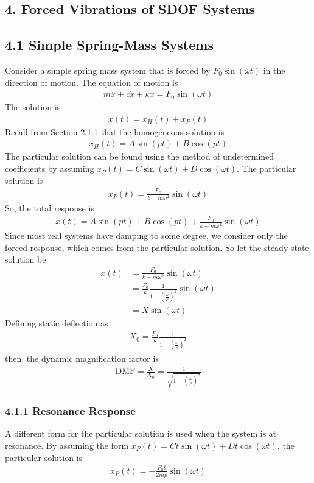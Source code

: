 \begin{multicols*}{2}
\section*{4. Forced Vibrations of SDOF Systems}
\subsection*{4.1 Simple Spring-Mass Systems}
Consider a simple spring mass system that is forced by $F_0 \sin(\omega t)$ in the direction of motion. The equation of motion is
\begin{align*}
    m\ddot{x} + c\dot{x} + kx = F_0\sin(\omega t)
\end{align*}
The solution is 
\begin{align*}
    x(t) = x_{H}(t) + x_{P}(t)
\end{align*}
Recall from Section 2.1.1 that the homogeneous solution is
\begin{align*}
    x_H(t) = A\sin(pt) + B\cos(pt)
\end{align*}
The particular solution can be found using the method of undetermined coefficients by assuming $x_P(t) = C\sin(\omega t) + D\cos(\omega t)$. The particular solution is
\begin{align*}
    x_P(t) = \frac{F_0}{k - m\omega^2}\sin(\omega t)
\end{align*}
So, the total response is
\begin{align*}
    x(t) = A\sin(pt) + B\cos(pt) + \frac{F_0}{k - m\omega^2}\sin(\omega t)
\end{align*}
Since most real systems have damping to some degree, we consider only the forced response, which comes from the particular solution. So let the steady state solution be
\begin{align*}
    x(t) &= \frac{F_0}{k - m\omega^2}\sin(\omega t) \\
    &= \frac{F_0}{k} \frac{1}{1 - \left(\frac{\omega}{p}\right)^2}\sin(\omega t) \\
    &= X \sin(\omega t)
\end{align*}
Defining static deflection as 
\begin{align*}
    X_0 = \frac{F_0}{k} \frac{1}{1 - \left(\frac{\omega}{p}\right)^2}
\end{align*}
then, the dynamic magnification factor is
\begin{align*}
    \text{DMF} = \frac{X}{X_0} = \frac{1}{\sqrt{1 - \left(\frac{\omega}{p}\right)^2}}
\end{align*}

\subsubsection*{4.1.1 Resonance Response}
A different form for the particular solution is used when the system is at resonance. By assuming the form $x_P(t) = C t \sin(\omega t) + D t \cos(\omega t)$, the particular solution is
\begin{align*}
    x_P(t) = - \frac{F_0 t}{2mp} \sin(\omega t)
\end{align*}


\end{multicols*}

